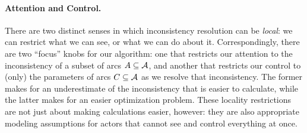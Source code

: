 \paragraph{Attention and Control.}
There are two distinct senses in which inconsistency resolution can
    be \emph{local}: we can restrict what we can see, or what we can do about it.
Correspondingly, there are two ``focus'' knobs for our algorithm:
    one that restricts our attention to the inconsistency of a subset of arcs $A \subseteq \mathcal A$,
    and another that restricts our control to (only) the parameters of
    arcs
    $C
     \subseteq \mathcal A$
      as we resolve that inconsistency.
The former makes for an underestimate of the inconsistency that is easier to calculate, while
the latter
makes for an easier optimization problem.
These locality restrictions are not just about making calculations easier, however:
    they are also appropriate modeling assumptions for
    actors that cannot see and control everything at once.

